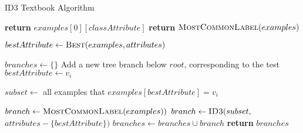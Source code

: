 \begin{algorithm}[H]
\caption{ID3 Textbook Algorithm}\label{a:id3-simple}
\begin{algorithmic}[1]
        \State \textbf{return} $examples[0][classAttribute]$
        \State \textbf{return} $\textsc{MostCommonLabel}(examples)$
    \EndIf

    \State $bestAttribute \gets \textsc{Best}(examples, attributes)$

    \State $branches \gets \{\}$
        \State Add a new tree branch below $root$, corresponding to the test $bestAttribute \gets v_i$

        \State $subset \gets$ all examples that $examples[bestAttribute] = v_i$

            \State $branch \gets \textsc{MostCommonLabel}(examples))$
        \Else
            \State $branch \gets \textsc{ID3}(subset,$ $attributes - \{bestAttribute\})$
        \EndIf
        \State $branches \gets branches \cup branch$
    \EndFor
    \State \textbf{return} $branches$
\EndProcedure
\end{algorithmic}
\end{algorithm}

